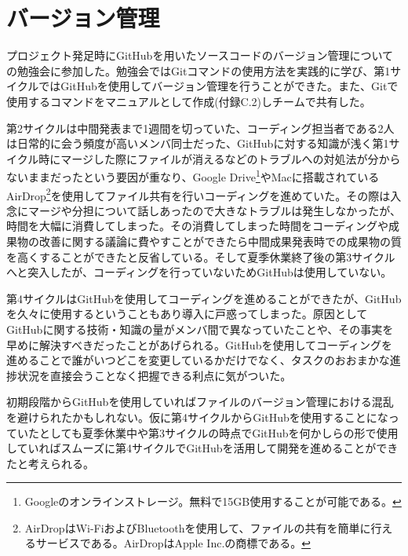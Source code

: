 \section{バージョン管理}
プロジェクト発足時にGitHubを用いたソースコードのバージョン管理についての勉強会に参加した。勉強会ではGitコマンドの使用方法を実践的に学び、第1サイクルではGitHubを使用してバージョン管理を行うことができた。また、Gitで使用するコマンドをマニュアルとして作成(付録C.2)しチームで共有した。
\par 第2サイクルは中間発表まで1週間を切っていた、コーディング担当者である2人は日常的に会う頻度が高いメンバ同士だった、GitHubに対する知識が浅く第1サイクル時にマージした際にファイルが消えるなどのトラブルへの対処法が分からないままだったという要因が重なり、Google Drive\footnote{Googleのオンラインストレージ。無料で15GB使用することが可能である。}やMacに搭載されているAirDrop\footnote{AirDropはWi-FiおよびBluetoothを使用して、ファイルの共有を簡単に行えるサービスである。AirDropはApple Inc.の商標である。}を使用してファイル共有を行いコーディングを進めていた。その際は入念にマージや分担について話しあったので大きなトラブルは発生しなかったが、時間を大幅に消費してしまった。その消費してしまった時間をコーディングや成果物の改善に関する議論に費やすことができたら中間成果発表時での成果物の質を高くすることができたと反省している。そして夏季休業終了後の第3サイクルへと突入したが、コーディングを行っていないためGitHubは使用していない。
\par 第4サイクルはGitHubを使用してコーディングを進めることができたが、GitHubを久々に使用するということもあり導入に戸惑ってしまった。原因としてGitHubに関する技術・知識の量がメンバ間で異なっていたことや、その事実を早めに解決すべきだったことがあげられる。GitHubを使用してコーディングを進めることで誰がいつどこを変更しているかだけでなく、タスクのおおまかな進捗状況を直接会うことなく把握できる利点に気がついた。
\par  初期段階からGitHubを使用していればファイルのバージョン管理における混乱を避けられたかもしれない。仮に第4サイクルからGitHubを使用することになっていたとしても夏季休業中や第3サイクルの時点でGitHubを何かしらの形で使用していればスムーズに第4サイクルでGitHubを活用して開発を進めることができたと考えられる。
